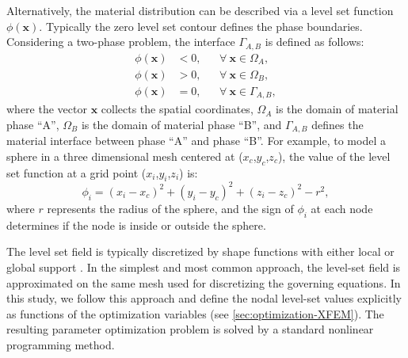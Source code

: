 Alternatively, the material distribution can be described via a level set function $\phi(\mathbf{x})$. Typically the zero level set contour defines the phase boundaries. Considering a two-phase problem, the interface $\Gamma_{A,B}$ is defined as follows:
%
\begin{equation}
\label{eq:level-set}
	\begin{aligned}
		\phi(\mathbf{x}) &< 0,    && \forall \ \mathbf{x} \in \Omega_A, \\
		\phi(\mathbf{x}) &> 0,    && \forall \ \mathbf{x} \in \Omega_B, \\
		\phi(\mathbf{x}) &= 0,    && \forall \ \mathbf{x} \in \Gamma_{A,B},
	\end{aligned}
\end{equation}
%
where the vector $\mathbf{x}$ collects the spatial coordinates, $\Omega_{A}$ is the domain of material phase ``A'', $\Omega_{B}$ is the domain of material phase ``B'', and $\Gamma_{A,B}$ defines the material interface between phase ``A'' and phase ``B''. For example, to model a sphere in a three dimensional mesh centered at ($x_c$,$y_c$,$z_c$), the value of the level set function at a grid point ($x_i$,$y_i$,$z_i$) is:
%
\begin{equation}
	\label{eqn:circle}
	\phi_i = { (x_i - x_c) }^2 + { (y_i - y_c) }^2 + { (z_i - z_c) }^2- r^2,
\end{equation}
%
where $r$ represents the radius of the sphere, and the sign of $\phi_{i}$ at each node determines if the node is inside or outside the sphere.

The level set field is typically discretized by shape functions with either local or global support \citep{DML+:13}. In the simplest and most common approach, the level-set field is approximated on the same mesh used for discretizing the governing equations. In this study, we follow this approach and define the nodal level-set values explicitly as functions of the optimization variables (see \ref{sec:optimization-XFEM}). The resulting parameter optimization problem is solved by a standard nonlinear programming method.

